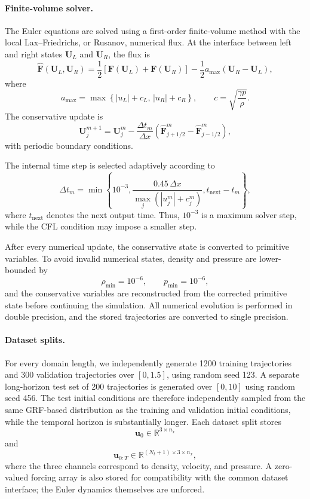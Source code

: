 \documentclass[11pt]{article}
\begin{document}
\paragraph{Finite-volume solver.}
The Euler equations are solved using a first-order finite-volume method with the local Lax--Friedrichs, or Rusanov, numerical flux. At the interface between left and right states $\mathbf{U}_L$ and $\mathbf{U}_R$, the flux is
\[
    \widehat{\mathbf{F}}
    (\mathbf{U}_L,\mathbf{U}_R)
    =
    \frac12
    \left[
        \mathbf{F}(\mathbf{U}_L)
        +
        \mathbf{F}(\mathbf{U}_R)
    \right]
    -
    \frac12
    a_{\max}
    \left(
        \mathbf{U}_R-\mathbf{U}_L
    \right),
\]
where
\[
    a_{\max}
    =
    \max
    \left\{
        |u_L|+c_L,\,
        |u_R|+c_R
    \right\},
    \qquad
    c
    =
    \sqrt{\frac{\gamma p}{\rho}}.
\]
The conservative update is
\[
    \mathbf{U}_j^{m+1}
    =
    \mathbf{U}_j^m
    -
    \frac{\Delta t_m}{\Delta x}
    \left(
        \widehat{\mathbf{F}}_{j+1/2}^m
        -
        \widehat{\mathbf{F}}_{j-1/2}^m
    \right),
\]
with periodic boundary conditions.

The internal time step is selected adaptively according to
\[
    \Delta t_m
    =
    \min
    \left\{
        10^{-3},
        \frac{0.45\,\Delta x}
        {\max_j\left(|u_j^m|+c_j^m\right)},
        t_{\mathrm{next}}-t_m
    \right\},
\]
where $t_{\mathrm{next}}$ denotes the next output time. Thus, $10^{-3}$ is a maximum solver step, while the CFL condition may impose a smaller step.

After every numerical update, the conservative state is converted to primitive variables. To avoid invalid numerical states, density and pressure are lower-bounded by
\[
    \rho_{\min}=10^{-6},
    \qquad
    p_{\min}=10^{-6},
\]
and the conservative variables are reconstructed from the corrected primitive state before continuing the simulation. All numerical evolution is performed in double precision, and the stored trajectories are converted to single precision.

\paragraph{Dataset splits.}
For every domain length, we independently generate 1200 training trajectories and 300 validation trajectories over $[0,1.5]$, using random seed 123. A separate long-horizon test set of 200 trajectories is generated over $[0,10]$ using random seed 456. The test initial conditions are therefore independently sampled from the same GRF-based distribution as the training and validation initial conditions, while the temporal horizon is substantially longer. Each dataset split stores
\[
    \mathbf{u}_0\in\mathbb{R}^{3\times n_x}
\]
and
\[
    \mathbf{u}_{0:T}\in\mathbb{R}^{(N_t+1)\times 3\times n_x},
\]
where the three channels correspond to density, velocity, and pressure. A zero-valued forcing array is also stored for compatibility with the common dataset interface; the Euler dynamics themselves are unforced.
\end{document}
